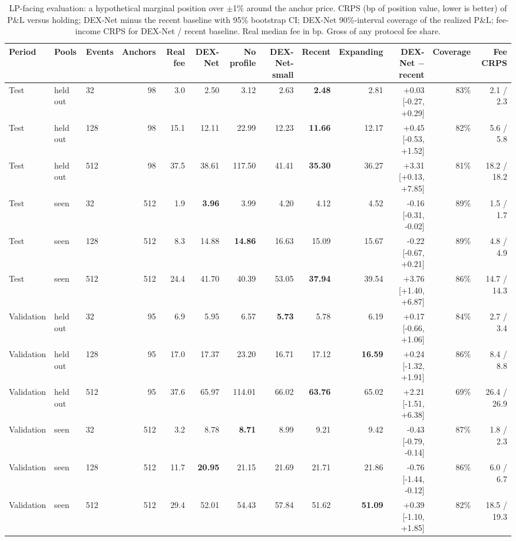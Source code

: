 \begin{table}[t]
\centering
\small
\caption{LP-facing evaluation: a hypothetical marginal position over $\pm$1\% around the anchor price. CRPS (bp of position value, lower is better) of P&L versus holding; DEX-Net minus the recent baseline with 95\% bootstrap CI; DEX-Net 90\%-interval coverage of the realized P&L; fee-income CRPS for DEX-Net / recent baseline. Real median fee in bp. Gross of any protocol fee share.}
\label{tab:lp_eval}
\begin{adjustbox}{max width=\linewidth}
\begin{tabular}{lllrrrrrrrrrr}
\toprule
Period & Pools & Events & Anchors & Real fee & DEX-Net & No profile & DEX-Net-small & Recent & Expanding & DEX-Net $-$ recent & Coverage & Fee CRPS \\
\midrule
Test & held out & 32 & 98 & 3.0 & 2.50 & 3.12 & 2.63 & \textbf{2.48} & 2.81 & +0.03 [-0.27, +0.29] & 83\% & 2.1 / 2.3 \\
Test & held out & 128 & 98 & 15.1 & 12.11 & 22.99 & 12.23 & \textbf{11.66} & 12.17 & +0.45 [-0.53, +1.52] & 82\% & 5.6 / 5.8 \\
Test & held out & 512 & 98 & 37.5 & 38.61 & 117.50 & 41.41 & \textbf{35.30} & 36.27 & +3.31 [+0.13, +7.85] & 81\% & 18.2 / 18.2 \\
\midrule
Test & seen & 32 & 512 & 1.9 & \textbf{3.96} & 3.99 & 4.20 & 4.12 & 4.52 & -0.16 [-0.31, -0.02] & 89\% & 1.5 / 1.7 \\
Test & seen & 128 & 512 & 8.3 & 14.88 & \textbf{14.86} & 16.63 & 15.09 & 15.67 & -0.22 [-0.67, +0.21] & 89\% & 4.8 / 4.9 \\
Test & seen & 512 & 512 & 24.4 & 41.70 & 40.39 & 53.05 & \textbf{37.94} & 39.54 & +3.76 [+1.40, +6.87] & 86\% & 14.7 / 14.3 \\
\midrule
Validation & held out & 32 & 95 & 6.9 & 5.95 & 6.57 & \textbf{5.73} & 5.78 & 6.19 & +0.17 [-0.66, +1.06] & 84\% & 2.7 / 3.4 \\
Validation & held out & 128 & 95 & 17.0 & 17.37 & 23.20 & 16.71 & 17.12 & \textbf{16.59} & +0.24 [-1.32, +1.91] & 86\% & 8.4 / 8.8 \\
Validation & held out & 512 & 95 & 37.6 & 65.97 & 114.01 & 66.02 & \textbf{63.76} & 65.02 & +2.21 [-1.51, +6.38] & 69\% & 26.4 / 26.9 \\
\midrule
Validation & seen & 32 & 512 & 3.2 & 8.78 & \textbf{8.71} & 8.99 & 9.21 & 9.42 & -0.43 [-0.79, -0.14] & 87\% & 1.8 / 2.3 \\
Validation & seen & 128 & 512 & 11.7 & \textbf{20.95} & 21.15 & 21.69 & 21.71 & 21.86 & -0.76 [-1.44, -0.12] & 86\% & 6.0 / 6.7 \\
Validation & seen & 512 & 512 & 29.4 & 52.01 & 54.43 & 57.84 & 51.62 & \textbf{51.09} & +0.39 [-1.10, +1.85] & 82\% & 18.5 / 19.3 \\
\bottomrule
\end{tabular}
\end{adjustbox}
\end{table}
